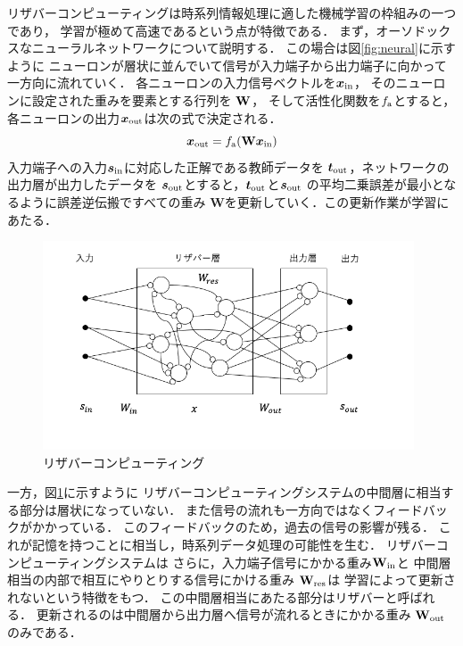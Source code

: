 \documentclass[uplatex,a4paper,12pt]{jsarticle}
\begin{document}
リザバーコンピューティングは時系列情報処理に適した機械学習の枠組みの一つであり，
学習が極めて高速であるという点が特徴である．
まず，オーソドックスなニューラルネットワークについて説明する．
この場合は図\ref{fig:neural}に示すように
ニューロンが層状に並んでいて信号が入力端子から出力端子に向かって一方向に流れていく．
各ニューロンの入力信号ベクトルを$\bm{x}_{\rm{in}}$，
そのニューロンに設定された重みを要素とする行列を
$\bf{W}$，
そして活性化関数を$f_{\rm{a}}$とすると，
各ニューロンの出力$\bm{x}_{\rm{out}}$は次の式で決定される．
\begin{equation}
    \bm{x}_{\rm{out}} = f_{\rm{a}}(\mathbf{W} \bm{x}_{\rm{in}})
\end{equation}
入力端子への入力$\bm{s}_{\rm{in}}$に対応した正解である教師データを
$\bm{t}_{\rm{out}}$，ネットワークの出力層が出力したデータを
$\bm{s}_{\rm{out}}$とすると，$\bm{t}_{\rm{out}}$と${\bm{s}_{\rm{out}}}$
の平均二乗誤差が最小となるように誤差逆伝搬ですべての重み
$\mathbf{W}$を更新していく．この更新作業が学習にあたる．

\begin{figure}[hbtp]
	\centering
	\includegraphics[width=110mm]{../img/reservoir.png}
    \caption{リザバーコンピューティング}
	\label{fig:reservoir}
\end{figure}

一方，図\ref{fig:reservoir}に示すように
リザバーコンピューティングシステムの中間層に相当する部分は層状になっていない．
また信号の流れも一方向ではなくフィードバックがかかっている．
このフィードバックのため，過去の信号の影響が残る．
これが記憶を持つことに相当し，時系列データ処理の可能性を生む．
リザバーコンピューティングシステムは
さらに，入力端子信号にかかる重み$\mathbf{W_{\rm{in}}}$と
中間層相当の内部で相互にやりとりする信号にかける重み
$\mathbf{W_{\rm{res}}}$は
学習によって更新されないという特徴をもつ．
この中間層相当にあたる部分はリザバーと呼ばれる．
更新されるのは中間層から出力層へ信号が流れるときにかかる重み
$\mathbf{W}_{\rm{out}}$のみである．
\end{document}
